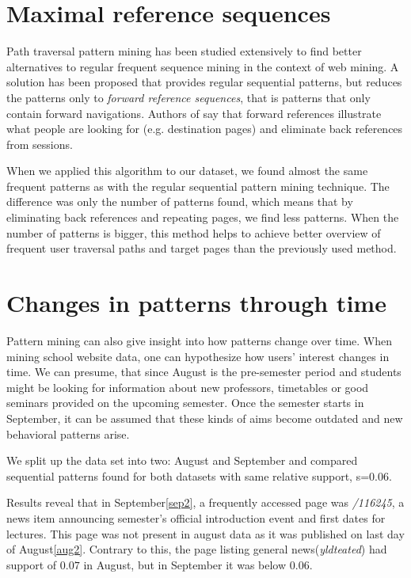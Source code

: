 \documentclass[12pt, english,a4paper]{article}
\begin{document}
\section{Maximal reference sequences}
Path traversal pattern mining has been studied extensively to find better alternatives to regular frequent sequence mining in the context of web mining. A solution has been proposed \cite{path_patterns} that provides regular sequential patterns, but reduces the patterns only to \emph{forward reference sequences}, that is patterns that only contain forward navigations. Authors of \cite{path_patterns} say that forward references illustrate what people are looking for (e.g. destination pages) and eliminate back references from sessions.

When we applied this algorithm to our dataset, we found almost the same frequent patterns as with the regular sequential pattern mining technique. The difference was only the number of patterns found, which means that by eliminating back references and repeating pages, we find less patterns. When the number of patterns is bigger, this method helps to achieve better overview of frequent user traversal paths and target pages than the previously used method.

\section{Changes in patterns through time} 
Pattern mining can also give insight into how patterns change over time. When mining school website data, one can hypothesize how users' interest changes in time. We can presume, that since August is the pre-semester period and students might be looking for information about new professors, timetables or good seminars provided on the upcoming semester. Once the semester starts in September, it can be assumed that these kinds of aims become outdated and new behavioral patterns arise.

We split up the data set into two: August and September and compared sequential patterns found for both datasets with same relative support, s=$0.06$.

Results reveal that in September\ref{sep2}, a frequently accessed page was \emph{/116245}, a news item announcing semester's official introduction event and first dates for lectures. This page was not present in august data as it was published on last day of August\ref{aug2}. Contrary to this, the page listing general news(\emph{yldteated}) had support of $0.07$ in August, but in September it was below $0.06$. 
\end{document}
